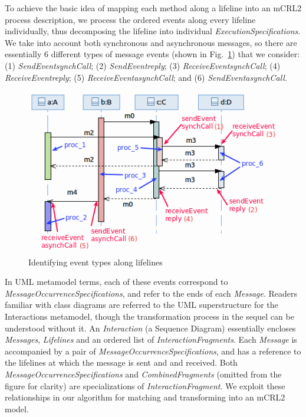 \documentclass[letter]{llncs}
\newcommand{\figshrink}{\vspace{-.6cm}}
\newcommand{\figshrinkend}{}
\begin{document}
To achieve the basic idea of mapping each method along a lifeline into an mCRL2 process description, we process the ordered events along every
lifeline individually, thus decomposing the lifeline into individual \emph{ExecutionSpecifications}. 
We take into account both synchronous and asynchronous messages, 
so there are essentially 6 different types of message events (shown in Fig.~\ref{fig:exampleProcesses}) that we consider: 
(1) \emph{SendEvent}\textunderscore\emph{synchCall}; (2) \emph{SendEvent}\textunderscore\emph{reply}; (3) \emph{ReceiveEvent}\textunderscore\emph{synchCall}; 
(4) \emph{ReceiveEvent}\textunderscore\emph{reply};
(5) \emph{ReceiveEvent}\textunderscore\emph{asynchCall}; and (6) \emph{SendEvent}\textunderscore\emph{asynchCall}.
\begin{figure}[!b]
\centering
\includegraphics[width=0.65\linewidth,keepaspectratio=true]{./Figure6.png}
\caption{Identifying event types along lifelines}
\label{fig:exampleProcesses}
\end{figure}
In UML metamodel terms, each of these events correspond to \emph{MessageOccurrenceSpecifications}, and refer to the ends of each \emph{Message}.
Readers familiar with class diagrams are referred to the UML superstructure\cite{UML2.4}
for the Interactions metamodel,
though the transformation process in the sequel can be understood
without it.
An \emph{Interaction} (a Sequence Diagram)
essentially encloses \emph{Messages}, \emph{Lifelines} and an ordered list of \emph{InteractionFragments}.
Each \emph{Message} is accompanied by a pair of \emph{MessageOccurrenceSpecifications}, and has a reference to
the lifelines at which the message is sent and and received. 
Both \emph{MessageOccurrenceSpecifications} and \emph{CombinedFragments} (omitted from the figure for clarity) 
are specializations of \emph{InteractionFragment}.
We exploit these relationships in our algorithm for matching and transforming into an mCRL2 model.
\end{document}
